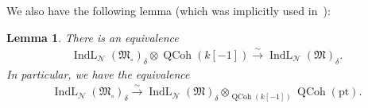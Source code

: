 \documentclass[11pt,oneside,a4paper,mathscr]{amsart}
\newtheorem{lemma}[thm]{Lemma}
\theoremstyle{definition}
\newcommand{\QCoh}{\operatorname{QCoh}}
\newcommand{\IndL}{\operatorname{IndL}}
\begin{document}
We also have the following lemma (which was implicitly used in~\cite{TodaGL2}): 


\begin{lemma}\label{lem:equiv:k}
There is an equivalence
\begin{align}\label{equiv:k-1}
    \IndL_{\mathcal{N}}(\mathfrak{M}_{\circ})_{\delta}
    \otimes \QCoh(k[-1])
    \stackrel{\sim}{\to}
    \IndL_{\mathcal{N}}(\mathfrak{M})_{\delta}.
\end{align}
In particular, we have the equivalence 
\begin{align*}
      \IndL_{\mathcal{N}}(\mathfrak{M}_{\circ})_{\delta}
    \stackrel{\sim}{\to}
    \IndL_{\mathcal{N}}(\mathfrak{M})_{\delta}\otimes_{\QCoh(k[-1])}\QCoh(\mathrm{pt}).
\end{align*}
\end{lemma}
\end{document}
